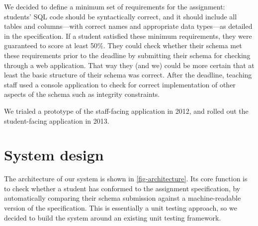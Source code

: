 \documentclass[sigconf, authordraft, capitalise]{acmart}
\begin{document}
We decided to define a minimum set of requirements for the assignment: students' SQL code should be syntactically correct, and it should include all tables and columns---with correct names and appropriate data types---as detailed in the specification. If a student satisfied these minimum requirements, they were guaranteed to score at least 50\%. They could check whether their schema met these requirements prior to the deadline by submitting their schema for checking through a web application. That way they (and we) could be more certain that at least the basic structure of their schema was correct. After the deadline, teaching staff used a console application to check for correct implementation of other aspects of the schema such as integrity constraints.

We trialed a prototype of the staff-facing application in 2012, and rolled out the student-facing application in 2013.


\section{System design}
\label{sec-design}

The architecture of our system is shown in \cref{fig-architecture}. Its core function is to check whether a student has conformed to the assignment specification, by automatically comparing their schema submission against a machine-readable version of the specification. This is essentially a unit testing approach, so we decided to build the system around an existing unit testing framework.
\end{document}
